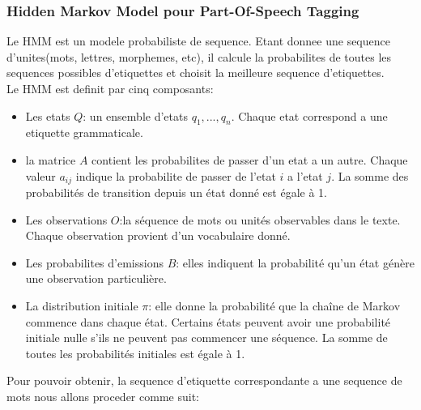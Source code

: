 \documentclass[12pt,a4paper]{report}
\begin{document}
	\subsubsection{Hidden Markov Model pour Part-Of-Speech Tagging}
	Le HMM est un modele probabiliste de sequence. Etant donnee une sequence d'unites(mots, lettres, morphemes, etc), il calcule la probabilites de toutes les sequences possibles d'etiquettes et choisit la meilleure sequence d'etiquettes.\\
	Le HMM est definit par cinq composants:\\
	\begin{itemize}
		\item Les etats $Q$: un ensemble d'etats $q_1, ..., q_n$. Chaque etat correspond a une etiquette grammaticale.
		\item la matrice $A$ contient les probabilites de passer d'un etat a un autre. Chaque valeur $a_{ij}$ indique la probabilite de passer de l'etat $i$ a l'etat $j$. La somme des probabilités de transition depuis un état donné est égale à 1.
		\item Les observations $O$:la séquence de mots ou unités observables dans le texte. Chaque observation provient d’un vocabulaire donné.
		\item Les probabilites d'emissions $B$: elles indiquent la probabilité qu’un état génère une observation particulière.
		\item La distribution initiale $\pi$: elle donne la probabilité que la chaîne de Markov commence dans chaque état. Certains états peuvent avoir une probabilité initiale nulle s’ils ne peuvent pas commencer une séquence. La somme de toutes les probabilités initiales est égale à 1.
	\end{itemize}
	Pour pouvoir obtenir, la sequence d'etiquette correspondante a une sequence de mots nous allons proceder comme suit:
\end{document}
